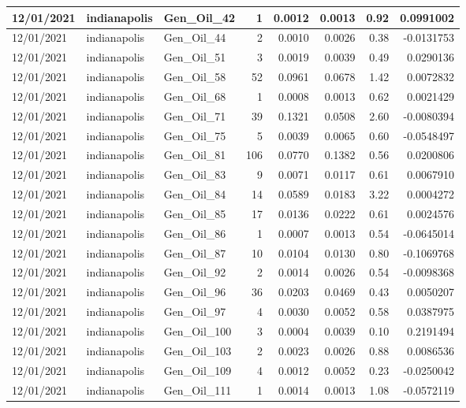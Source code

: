 \documentclass[
  letterpaper,
  DIV=11,
  numbers=noendperiod]{scrartcl}
\begin{document}
\begin{tabular}{l|l|l|r|r|r|r|r}
\hline
12/01/2021 & indianapolis & Gen\_Oil\_42 & 1 & 0.0012 & 0.0013 & 0.92 & 0.0991002\\
\hline
12/01/2021 & indianapolis & Gen\_Oil\_44 & 2 & 0.0010 & 0.0026 & 0.38 & -0.0131753\\
\hline
12/01/2021 & indianapolis & Gen\_Oil\_51 & 3 & 0.0019 & 0.0039 & 0.49 & 0.0290136\\
\hline
12/01/2021 & indianapolis & Gen\_Oil\_58 & 52 & 0.0961 & 0.0678 & 1.42 & 0.0072832\\
\hline
12/01/2021 & indianapolis & Gen\_Oil\_68 & 1 & 0.0008 & 0.0013 & 0.62 & 0.0021429\\
\hline
12/01/2021 & indianapolis & Gen\_Oil\_71 & 39 & 0.1321 & 0.0508 & 2.60 & -0.0080394\\
\hline
12/01/2021 & indianapolis & Gen\_Oil\_75 & 5 & 0.0039 & 0.0065 & 0.60 & -0.0548497\\
\hline
12/01/2021 & indianapolis & Gen\_Oil\_81 & 106 & 0.0770 & 0.1382 & 0.56 & 0.0200806\\
\hline
12/01/2021 & indianapolis & Gen\_Oil\_83 & 9 & 0.0071 & 0.0117 & 0.61 & 0.0067910\\
\hline
12/01/2021 & indianapolis & Gen\_Oil\_84 & 14 & 0.0589 & 0.0183 & 3.22 & 0.0004272\\
\hline
12/01/2021 & indianapolis & Gen\_Oil\_85 & 17 & 0.0136 & 0.0222 & 0.61 & 0.0024576\\
\hline
12/01/2021 & indianapolis & Gen\_Oil\_86 & 1 & 0.0007 & 0.0013 & 0.54 & -0.0645014\\
\hline
12/01/2021 & indianapolis & Gen\_Oil\_87 & 10 & 0.0104 & 0.0130 & 0.80 & -0.1069768\\
\hline
12/01/2021 & indianapolis & Gen\_Oil\_92 & 2 & 0.0014 & 0.0026 & 0.54 & -0.0098368\\
\hline
12/01/2021 & indianapolis & Gen\_Oil\_96 & 36 & 0.0203 & 0.0469 & 0.43 & 0.0050207\\
\hline
12/01/2021 & indianapolis & Gen\_Oil\_97 & 4 & 0.0030 & 0.0052 & 0.58 & 0.0387975\\
\hline
12/01/2021 & indianapolis & Gen\_Oil\_100 & 3 & 0.0004 & 0.0039 & 0.10 & 0.2191494\\
\hline
12/01/2021 & indianapolis & Gen\_Oil\_103 & 2 & 0.0023 & 0.0026 & 0.88 & 0.0086536\\
\hline
12/01/2021 & indianapolis & Gen\_Oil\_109 & 4 & 0.0012 & 0.0052 & 0.23 & -0.0250042\\
\hline
12/01/2021 & indianapolis & Gen\_Oil\_111 & 1 & 0.0014 & 0.0013 & 1.08 & -0.0572119\\

\end{tabular}
\end{document}
